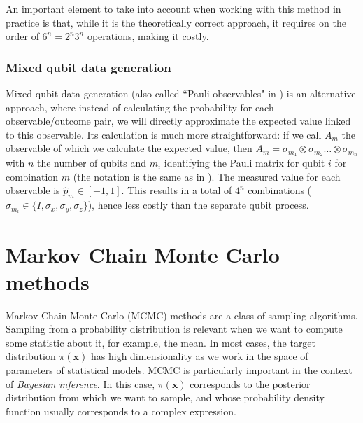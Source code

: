 \documentclass[12pt]{memoir}
\newcommand{\mb}{\mathbf}
\newcommand{\ti}{\textit}
\begin{document}
An important element to take into account when working with this method in practice is that, while it is the theoretically correct approach, it requires on the order of $6^n = 2^n 3^n$ operations, making it costly.



\subsubsection*{Mixed qubit data generation}\label{section:mixed-qub-dg}

Mixed qubit data generation (also called ``Pauli observables" in \cite{Guta20}) is an alternative approach, where instead of calculating the probability for each observable/outcome pair, we will directly approximate the expected value linked to this observable. Its calculation is much more straightforward: if we call $A_m$ the observable of which we calculate the expected value, then $A_m = \sigma_{m_1} \otimes \sigma_{m_2} \dots \otimes \sigma_{m_n}$ with $n$ the number of qubits and $m_i$ identifying the Pauli matrix for qubit $i$ for combination $m$ (the notation is the same as in \cite{meth:bayesian:Langevin:ACMT2024}). The measured value for each observable is $\hat p_m \in[-1, 1]$. This results in a total of $4^n$ combinations ($\sigma_{m_i} \in \{I, \sigma_x, \sigma_y, \sigma_z\}$), hence less costly than the separate qubit process.

\newpage

\section{Markov Chain Monte Carlo methods}\label{section:mcmc-methods}
Markov Chain Monte Carlo (MCMC) methods are a class of sampling algorithms. Sampling from a probability distribution is relevant when we want to compute some statistic about it, for example, the mean. In most cases, the target distribution $\pi(\mb x)$ has high dimensionality as we work in the space of parameters of statistical models. MCMC is particularly important in the context of \ti{Bayesian inference}. In this case, $\pi(\mb x)$ corresponds to the posterior distribution from which we want to sample, and whose probability density function usually corresponds to a complex expression. \medbreak
\end{document}
